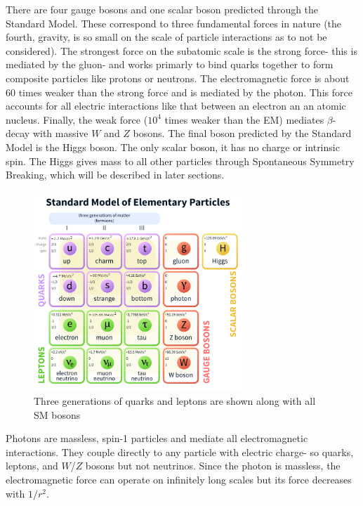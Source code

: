 There are four gauge bosons and one scalar boson predicted through the Standard Model. These correspond to three fundamental forces in nature (the fourth, gravity, is so small on the scale of particle interactions as to not be considered). The strongest force on the subatomic scale is the strong force- this is mediated by the gluon- and works primarly to bind quarks together to form composite particles like protons or neutrons. The electromagnetic force is about $60$ times weaker than the strong force and is mediated by the photon. This force accounts for all electric interactions like that between an electron an an atomic nucleus. Finally, the weak force ($10^4$ times weaker than the EM) mediates $\beta$-decay with massive $W$ and $Z$ bosons. The final boson predicted by the Standard Model is the Higgs boson. The only scalar boson, it has no charge or intrinsic spin. The Higgs gives mass to all other particles through Spontaneous Symmetry Breaking, which will be described in later sections.
\begin{figure}[H]
	\centering
    \includegraphics[width=0.7\textwidth] {Pictures/SMparticles.png}\hspace{1cm}
    \caption{Three generations of quarks and leptons are shown along with all SM bosons \cite{PDG}}
    \label{fig:SMparticles}
\end{figure}
Photons are massless, spin-1 particles and mediate all electromagnetic interactions. They couple directly to any particle with electric charge- so quarks, leptons, and $W$/$Z$ bosons but not neutrinos. Since the photon is massless, the electromagnetic force can operate on infinitely long scales but its force decreases with $1/r^2$.
 
